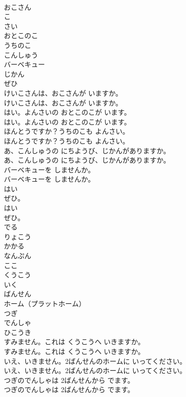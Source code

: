 \documentclass[8pt]{extreport}
\begin{document}
\begin{CJK}{UTF8}{min}
\\	おこさん
\\	こ
\\	さい
\\	おとこのこ
\\	うちのこ
\\	こんしゅう
\\	バーベキュー
\\	じかん
\\	ぜひ
\\	けいこさんは、おこさんが いますか。
\\	けいこさんは、おこさんが いますか。
\\	はい。よんさいの おとこのこが います。
\\	はい。よんさいの おとこのこが います。
\\	ほんとうですか？うちのこも よんさい。
\\	ほんとうですか？うちのこも よんさい。
\\	あ、こんしゅうの にちようび、じかんがありますか。
\\	あ、こんしゅうの にちようび、じかんがありますか。
\\	バーベキューを しませんか。
\\	バーベキューを しませんか。
\\	はい
\\	ぜひ。
\\	はい
\\	ぜひ。
\\	でる
\\	りょこう
\\	かかる
\\	なんぷん
\\	ここ
\\	くうこう
\\	いく
\\	ばんせん
\\	ホーム（プラットホーム）
\\	つぎ
\\	でんしゃ
\\	ひこうき
\\	すみません。これは くうこうへ いきますか。
\\	すみません。これは くうこうへ いきますか。
\\	いえ、いきません。2ばんせんのホームに いってください。
\\	いえ、いきません。2ばんせんのホームに いってください。
\\	つぎのでんしゃは 2ばんせんから でます。
\\	つぎのでんしゃは 2ばんせんから でます。

\end{CJK}
\end{document}

